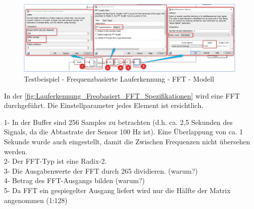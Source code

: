 \begin{figure}[H]
	\centering
	\includegraphics[width=\linewidth]{Bilder/Lauferkennung_Freqbasiert_FFT_Spezifikationen.png}
	\caption{Testbeispiel - Frequenzbasierte Lauferkennung - FFT - Modell}
	\label{fig:Lauferkennung_Freqbasiert_FFT_Spezifikationen}
\end{figure}
In der \autoref{fig:Lauferkennung_Freqbasiert_FFT_Spezifikationen} wird eine FFT durchgeführt. Die Einstellparameter jedes Element ist ersichtlich.

1-	In der Buffer sind 256 Samples zu betrachten (d.h. ca. 2,5 Sekunden des Signals, da die Abtastrate der Sensor 100 Hz ist). Eine Überlappung von ca. 1 Sekunde wurde auch eingestellt, damit die Zwischen Frequenzen nicht übersehen werden.\\
2-	Der FFT-Typ ist eine Radix-2.\\
3-	Die Ausgabenwerte der FFT durch 265 dividieren. (warum?)\\ %
4-	Betrag des FFT-Ausgangs bilden (warum?)\\ %
5-	Da FFT ein gespiegelter Ausgang liefert wird nur die Hälfte der Matrix angenommen (1:128)\\
